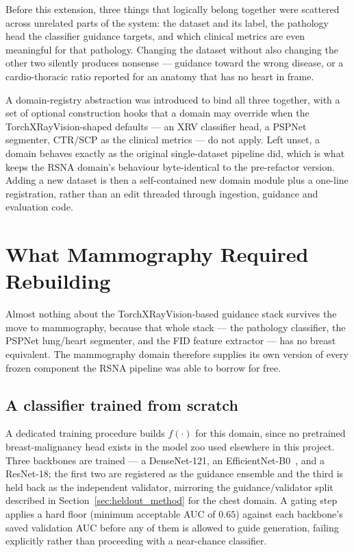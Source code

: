 Before this extension, three things that logically belong together were
scattered across unrelated parts of the system: the dataset and its label,
the pathology head the classifier guidance targets, and which clinical
metrics are even meaningful for that pathology. Changing the dataset without
also changing the other two silently produces nonsense --- guidance toward
the wrong disease, or a cardio-thoracic ratio reported for an anatomy that
has no heart in frame.

A domain-registry abstraction was introduced to bind all three together,
with a set of optional construction hooks that a domain may override when
the TorchXRayVision-shaped defaults --- an XRV classifier head, a PSPNet
segmenter, CTR/SCP as the clinical metrics --- do not apply. Left unset, a
domain behaves exactly as the original single-dataset pipeline did, which
is what keeps the RSNA domain's behaviour byte-identical to the
pre-refactor version. Adding a new dataset is then a self-contained new
domain module plus a one-line registration, rather than an edit threaded
through ingestion, guidance and evaluation code.

\section{What Mammography Required Rebuilding}

Almost nothing about the TorchXRayVision-based guidance stack survives the
move to mammography, because that whole stack --- the pathology classifier,
the PSPNet lung/heart segmenter, and the FID feature extractor --- has no
breast equivalent. The mammography domain therefore supplies its own
version of every frozen component the RSNA pipeline was able to borrow for
free.

\subsection{A classifier trained from scratch}

A dedicated training procedure builds $f(\cdot)$ for this domain, since no
pretrained breast-malignancy head exists in the model zoo used elsewhere in
this project. Three backbones are trained --- a DenseNet-121, an
EfficientNet-B0~\cite{tan2019efficientnet}, and a ResNet-18; the first two
are registered as the guidance ensemble and the third is held back as the
independent validator, mirroring the guidance/validator split described in
Section~\ref{sec:heldout_method} for the chest domain. A gating step
applies a hard floor (minimum acceptable AUC of $0.65$) against each
backbone's saved validation AUC before any of them is allowed to guide
generation, failing explicitly rather than proceeding with a near-chance
classifier.

